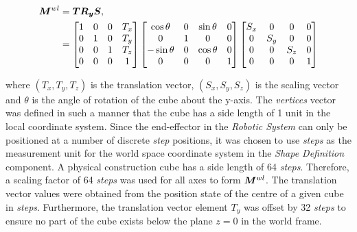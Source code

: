\begin{align}
	\bm{M}^{wl}&=\bm{T}\bm{R_y}\bm{S},\\
	&=
	\begin{bmatrix}
		1 & 0 & 0 & T_x\\
		0 & 1 & 0 & T_y\\
		0 & 0 & 1 & T_z\\
		0 & 0 & 0 & 1
	\end{bmatrix}
	\begin{bmatrix}
		\cos\theta & 0 & \sin\theta & 0\\
		0 & 1 & 0 & 0\\
		-\sin\theta & 0 & \cos\theta & 0\\
		0 & 0 & 0 & 1
	\end{bmatrix}
	\begin{bmatrix}
		S_x & 0 & 0 & 0\\
		0 & S_y & 0 & 0\\
		0 & 0 & S_z & 0\\
		0 & 0 & 0 & 1
	\end{bmatrix}
\end{align}

where $(T_x, T_y, T_z)$ is the translation vector, $(S_x, S_y, S_z)$ is the scaling vector and $\theta$ is the angle of rotation of the cube about the y-axis. The \textit{vertices} vector was defined in such a manner that the cube has a side length of 1 unit in the local coordinate system. Since the end-effector in the \textit{Robotic System} can only be positioned at a number of discrete \textit{step} positions, it was chosen to use \textit{steps} as the measurement unit for the world space coordinate system in the \textit{Shape Definition} component. A physical construction cube has a side length of 64 \textit{steps}. Therefore, a scaling factor of 64 \textit{steps} was used for all axes to form $\bm{M}^{wl}$. The translation vector values were obtained from the position state of the centre of a given cube in \textit{steps}. Furthermore, the translation vector element $T_y$ was offset by 32 \textit{steps} to ensure no part of the cube exists below the plane $z=0$ in the world frame.






